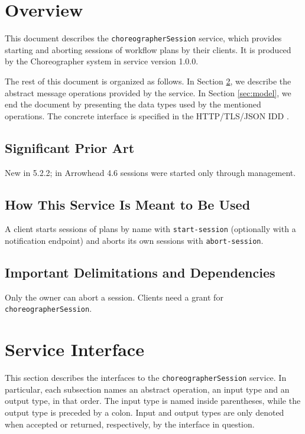 \documentclass[a4paper]{arrowhead}
\begin{document}
\section{Overview}
\label{sec:overview}

This document describes the \texttt{choreographer\allowbreak{}Session} service, which provides starting and aborting sessions of workflow plans by their clients.
It is produced by the Choreographer system \cite{cho-sysd} in service version 1.0.0.

The rest of this document is organized as follows.
In Section \ref{sec:operations}, we describe the abstract message operations provided by the service.
In Section \ref{sec:model}, we end the document by presenting the data types used by the mentioned operations.
The concrete interface is specified in the HTTP/TLS/JSON IDD \cite{cho-choreographerSession-http-idd}.

\subsection{Significant Prior Art}

New in 5.2.2; in Arrowhead 4.6 sessions were started only through management.

\subsection{How This Service Is Meant to Be Used}

A client starts sessions of plans by name with \texttt{start-\allowbreak{}session} (optionally with a notification endpoint) and aborts its own sessions with \texttt{abort-\allowbreak{}session}.

\subsection{Important Delimitations and Dependencies}
\label{sec:delimitations}

Only the owner can abort a session. Clients need a grant for \texttt{choreographer\allowbreak{}Session}.

\newpage

\section{Service Interface}
\label{sec:operations}

This section describes the interfaces to the \texttt{choreographer\allowbreak{}Session} service.
In particular, each subsection names an abstract operation, an input type and an output type, in that order.
The input type is named inside parentheses, while the output type is preceded by a colon.
Input and output types are only denoted when accepted or returned, respectively, by the interface in question.
\end{document}
